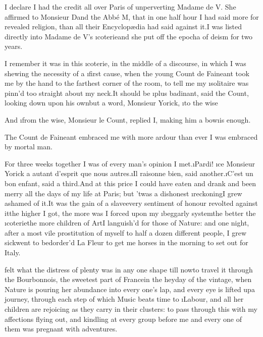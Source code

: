 \documentclass[twoside]{article}
\begin{document}
I declare I had the credit all over Paris
of unperverting Madame de V\tskk .\tskk
She affirmed to Monsieur D\tskk  and the
Abbé M\tskk , that in one half hour I had
said more for revealed religion, than all
their Encyclopædia had said against
it.\tskk I was listed directly into Madame
de V\tskk ’s \i{coterie}\tskk and she put
off the epocha of deism for two years.

I remember it was in this \i{coterie}, in
the middle of a discourse, in which I was
shewing the necessity of a \i{first}
cause, when the young Count de Faineant
took me by the hand to the farthest corner
of the room, to tell me my \i{solitaire}
was pinn’d too straight about my
neck.\tskk It should be \i{plus badinant},
said the Count, looking down upon his
own\tskk but a word, Monsieur Yorick,
\i{to the wise}\tskk 

And \i{from the wise}, Monsieur le Count,
replied I, making him a bow\tskk \i{is
enough}.

The Count de Faineant embraced me with
more ardour than ever I was embraced by
mortal man.

For three weeks together I was of every
man’s opinion I met.\tskk \i{Pardi}! \i{ce
Monsieur Yorick a autant d’esprit que nous
autres}.\tskk \i{Il raisonne bien}, said
another.\tskk \i{C’est un bon enfant},
said a third.\tskk And at this price I
could have eaten and drank and been merry
all the days of my life at Paris; but
’twas a dishonest \i{reckoning}\tskk I
grew ashamed of it.\tskk It was the gain
of a slave\tskk every sentiment of honour
revolted against it\tskk the higher I
got, the more was I forced upon my
\i{beggarly system}\tskk the better the
\i{coterie}\tskk the more children of
Art\tskk I languish’d for those of
Nature: and one night, after a most vile
prostitution of myself to half a dozen
different people, I grew sick\tskk went
to bed\tskk order’d La Fleur to get me
horses in the morning to set out for
Italy.





\vskip 6pt


 felt what the distress
of plenty was in any one shape till
now\tskk to travel it through the
Bourbonnois, the sweetest part of
France\tskk in the heyday of the vintage,
when Nature is pouring her abundance into
every one’s lap, and every eye is lifted
up\tskk a journey, through each step of
which Music beats time to \i{Labour}, and
all her children are rejoicing as they
carry in their clusters: to pass through
this with my affections flying out, and
kindling at every group before me\tskk
and every one of them was pregnant with
adventures.\tskk 
\end{document}
